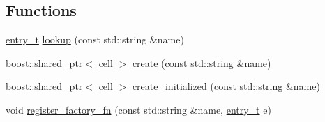 \subsection*{Functions}
\begin{DoxyCompactItemize}
\item 
\hyperlink{structecto_1_1registry_1_1entry__t}{entry\-\_\-t} \hyperlink{namespaceecto_1_1registry_a6418eb4a71ad1556cf3555da28e16a8d}{lookup} (const std\-::string \&name)
\item 
boost\-::shared\-\_\-ptr$<$ \hyperlink{structecto_1_1cell}{cell} $>$ \hyperlink{namespaceecto_1_1registry_a784e20c3d722892c0ce9f129b6c2f757}{create} (const std\-::string \&name)
\item 
boost\-::shared\-\_\-ptr$<$ \hyperlink{structecto_1_1cell}{cell} $>$ \hyperlink{namespaceecto_1_1registry_af698665e1f634f8634ecd7348aa778ab}{create\-\_\-initialized} (const std\-::string \&name)
\item 
void \hyperlink{namespaceecto_1_1registry_aef6687acec4199b3863fac767049bf76}{register\-\_\-factory\-\_\-fn} (const std\-::string \&name, \hyperlink{structecto_1_1registry_1_1entry__t}{entry\-\_\-t} e)
\end{DoxyCompactItemize}


